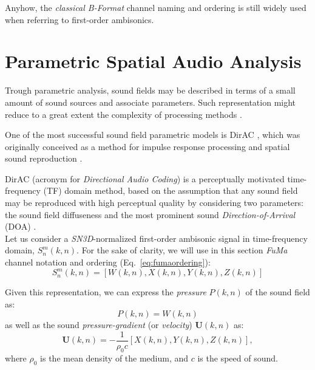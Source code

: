 Anyhow, the \textit{classical B-Format} channel naming and ordering is still widely used when referring to first-order ambisonics. 


\section{Parametric Spatial Audio Analysis}

Trough parametric analysis, sound fields may be described in terms of a small amount of sound sources and associate parameters. Such representation might reduce to a great extent the complexity of processing methods \cite{jarrett2017theory}.

One of the most successful sound field parametric models is DirAC \cite{Pulkki07}, which was originally conceived as a method for impulse response processing and spatial sound reproduction \cite{merimaa2005spatial}.

DirAC (acronym for \textit{Directional Audio Coding}) is a perceptually motivated time-frequency (TF) domain method, based on the assumption that any sound field may be reproduced with high perceptual quality by considering two parameters: the sound field diffuseness and the most prominent sound \textit{Direction-of-Arrival} (DOA) \cite{pulkki2018parametric}. \\



Let us consider a \textit{SN3D}-normalized first-order ambisonic signal in time-frequency domain, $S_n^m(k, n)$. 
For the sake of clarity, we will use in this section \textit{FuMa} channel notation and ordering (Eq.~\ref{eq:fumaordering}):
\begin{equation}
	S_n^m(k, n) = [W(k, n), X(k, n), Y(k, n), Z(k, n)]
\end{equation}

Given this representation, we can express the \textit{pressure} $P(k,n)$ of the sound field as:
\begin{equation}
	P(k,n) = W(k,n)
\end{equation}
as well as the sound \textit{pressure-gradient} (or \textit{velocity}) $\pmb{U}(k,n)$ as: 
\begin{equation}
	\pmb{U}(k,n) = - \frac{1}{\rho_0 c} [X(k, n), Y(k, n), Z(k, n)], 
\end{equation}
where $\rho_0$ is the mean density of the medium, and $c$ is the speed of sound.\\ 

